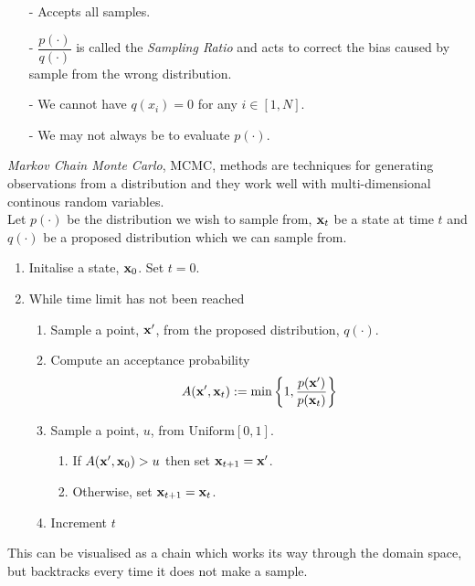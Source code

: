 \documentclass[11pt,a4paper]{article}
\begin{document}
\begin{itemize}
	\item[-] Accepts all samples.
	\item[-] $\dfrac{p(\cdot)}{q(\cdot)}$ is called the \textit{Sampling Ratio} and acts to correct the bias caused by sample from the wrong distribution.
	\item[-] We cannot have $q(x_i)=0$ for any $i\in[1,N]$.
	\item[-] We may not always be to evaluate $p(\cdot)$.
\end{itemize}

\textit{Markov Chain Monte Carlo}, MCMC, methods are techniques for generating observations from a distribution and they work well with multi-dimensional continous random variables.\\
Let $p(\cdot)$ be the distribution we wish to sample from, $\textbf{x}_t$ be a state at time $t$ and $q(\cdot)$ be a proposed distribution which we can sample from.
\begin{enumerate}
	\item Initalise a state, $\textbf{x}_0$. Set $t=0$.
	\item While time limit has not been reached
	\begin{enumerate}[label=\arabic*)]
		\item Sample a point, $\textbf{x}'$, from the proposed distribution, $q(\cdot)$.
		\item Compute an acceptance probability
		$$A(\textbf{x}',\textbf{x}_t):=\min\left\{1,\frac{p(\textbf{x}')}{p(\textbf{x}_t)}\right\}$$
		\item Sample a point, $u$, from $\text{Uniform}[0,1]$.
		\begin{enumerate}
			\item If $A(\textbf{x}',\textbf{x}_0)>u$ then set $\textbf{x}_{t+1}=\textbf{x}'$.
			\item Otherwise, set $\textbf{x}_{t+1}=\textbf{x}_t$.
		\end{enumerate}	
		\item Increment $t$
	\end{enumerate}
\end{enumerate}
This can be visualised as a chain which works its way through the domain space, but backtracks every time it does not make a sample.
\end{document}
